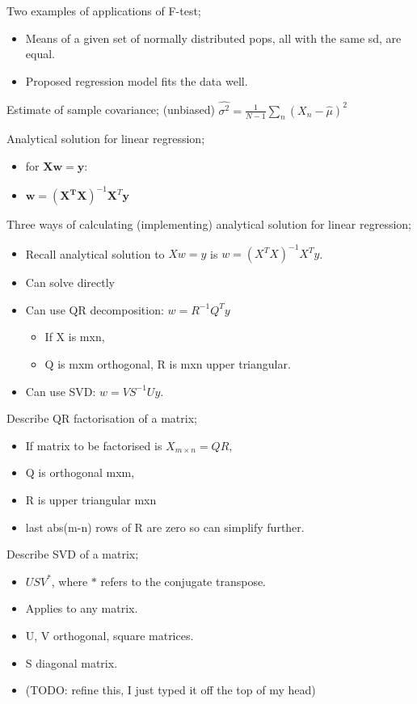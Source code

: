 \documentclass{article}
\begin{document}
Two examples of applications of F-test; \begin{itemize} \item Means of a given set of normally distributed pops, all with the same sd, are equal. \item Proposed regression model fits the data well. \end{itemize}

Estimate of sample covariance; (unbiased) $\hat{\sigma^2} = \frac{1}{N-1}\sum_n (X_n-\hat{\mu})^2$

Analytical solution for linear regression; \begin{itemize} \item for $\mathbf{Xw} = \mathbf{y}$: \item $\mathbf{w}=(\mathbf{X^TX})^{-1}\mathbf{X}^T\mathbf{y}$ \end{itemize} 

Three ways of calculating (implementing) analytical solution for linear regression; \begin{itemize} \item Recall analytical solution to $Xw = y$ is $w = (X^TX)^{-1}X^Ty$. \item Can solve directly \item Can use QR decomposition: $w=R^{-1}Q^Ty$ \begin{itemize} \item If X is mxn, \item Q is mxm orthogonal, R is mxn upper triangular. \end{itemize} \item Can use SVD: $w=VS^{-1}Uy$. \end{itemize}

Describe QR factorisation of a matrix; \begin{itemize} \item If matrix to be factorised is $X_{m\times n}=QR$, \item Q is orthogonal mxm, \item R is upper triangular mxn \item last abs(m-n) rows of R are zero so can simplify further.  \end{itemize}

Describe SVD of a matrix; \begin{itemize} \item $USV^*$, where $*$ refers to the conjugate transpose. \item Applies to any matrix. \item U, V orthogonal, square matrices. \item S diagonal matrix. \item (TODO: refine this, I just typed it off the top of my head) \end{itemize}
\end{document}
